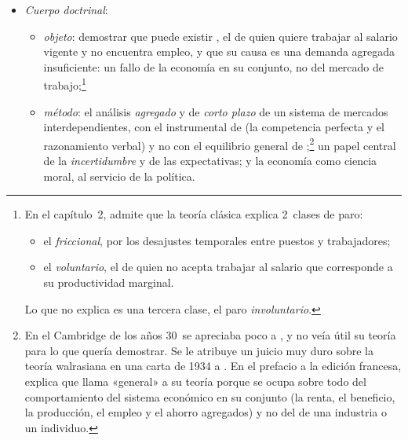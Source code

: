 \documentclass[11pt]{article}
\begin{document}
\begin{itemize}
\begin{itemize}
\begin{itemize}
\begin{itemize}
    \item los \emph{keynesianos del desequilibrio}:  como antecedente, , , ,  y  (\ref{sec:desequilibrio}).
    \end{itemize}
    \end{itemize}
  \item \emph{Cuerpo doctrinal}:
    \begin{itemize}
    \item \emph{objeto}: demostrar que puede existir , el de quien quiere trabajar al salario vigente y no encuentra empleo, y que su causa es una demanda agregada insuficiente: un fallo de la economía en su conjunto, no del mercado de trabajo\nocite{DeVroey2016History};\footnote{En el capítulo~2,  admite que la teoría clásica explica 2~clases de paro:
\begin{itemize}
\item el \emph{friccional}, por los desajustes temporales entre puestos y trabajadores;
\item el \emph{voluntario}, el de quien no acepta trabajar al salario que corresponde a su productividad marginal.
\end{itemize}
Lo que no explica es una tercera clase, el paro \emph{involuntario}\nocite{Keynes1936}.}
    \item \emph{método}: el análisis \emph{agregado} y de \emph{corto plazo} de un sistema de mercados interdependientes, con el instrumental de  (la competencia perfecta y el razonamiento verbal) y no con el equilibrio general de ;\footnote{En el Cambridge de los años 30~se apreciaba poco a , y  no veía útil su teoría para lo que quería demostrar\nocite{DeVroey2016History}. Se le atribuye un juicio muy duro sobre la teoría walrasiana en una carta de 1934 a . En el prefacio a la edición francesa, \textcite{Keynes1939Prefacio} explica que llama «general» a su teoría porque se ocupa sobre todo del comportamiento del sistema económico en su conjunto (la renta, el beneficio, la producción, el empleo y el ahorro agregados) y no del de una industria o un individuo.} un papel central de la \emph{incertidumbre} y de las expectativas; y la economía como ciencia moral, al servicio de la política.
    \end{itemize}
  \end{itemize}
\end{itemize}
\end{document}
